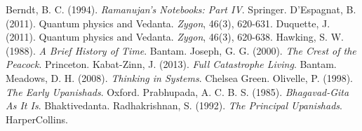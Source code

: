 \documentclass[11pt]{article}
\begin{document}
\begin{thebibliography}{9}
 Berndt, B. C. (1994). \textit{Ramanujan's Notebooks: Part IV}. Springer.
 D'Espagnat, B. (2011). Quantum physics and Vedanta. \textit{Zygon}, 46(3), 620-631.
 Duquette, J. (2011). Quantum physics and Vedanta. \textit{Zygon}, 46(3), 620-638.
 Hawking, S. W. (1988). \textit{A Brief History of Time}. Bantam.
 Joseph, G. G. (2000). \textit{The Crest of the Peacock}. Princeton.
 Kabat-Zinn, J. (2013). \textit{Full Catastrophe Living}. Bantam.
 Meadows, D. H. (2008). \textit{Thinking in Systems}. Chelsea Green.
 Olivelle, P. (1998). \textit{The Early Upanishads}. Oxford.
 Prabhupada, A. C. B. S. (1985). \textit{Bhagavad-Gita As It Is}. Bhaktivedanta.
 Radhakrishnan, S. (1992). \textit{The Principal Upanishads}. HarperCollins.
\end{thebibliography}
\end{document}
